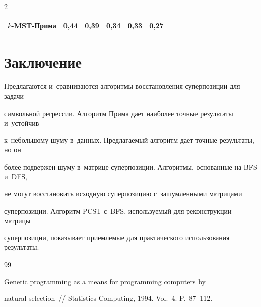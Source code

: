 \begin{multicols}{2}
\begin{center}
{\begin{tabular}{|l|ccccc|}
      $k$-MST-Прима  &0,44 &0,39 &0,34 &0,33 &0,27 \\

      \hline

    \end{tabular}

    }

\end{center}




\vspace*{-9pt}



\section{Заключение}



\vspace*{-3pt}



Предлагаются и~сравниваются  алгоритмы вос\-ста\-нов\-ле\-ния суперпозиции для задачи 

символьной регрессии. Алгоритм Прима дает наиболее точ\-ные результаты и~устойчив 

к~небольшому шуму в~данных. Пред\-ла\-га\-емый алгоритм дает точные результаты, но он 

более подвержен шуму в~мат\-ри\-це суперпозиции. Алгоритмы, основанные на BFS и~DFS, 

не могут вос\-ста\-но\-вить исходную суперпозицию с~зашумленными мат\-ри\-ца\-ми 

суперпозиции. Алгоритм PCST с~BFS, используемый для реконструкции мат\-ри\-цы 

суперпозиции, показывает приемлемые для практического использования результаты.



{\small\frenchspacing

 {%


 \begin{thebibliography}{99}


 Genetic programming as a means for programming computers by 

natural selection~// Statistics Computing, 1994. Vol.~4. P.~87--112.




\end{thebibliography}}}
\end{multicols}
